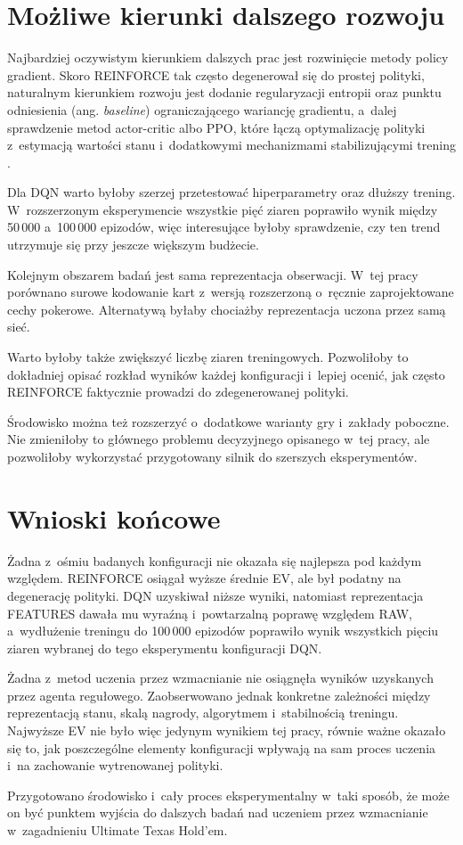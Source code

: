 \section*{Możliwe kierunki dalszego rozwoju}
\label{sec:dalszy-rozwoj}

Najbardziej oczywistym kierunkiem dalszych prac jest rozwinięcie
metody policy gradient. Skoro REINFORCE tak często degenerował się do
prostej polityki, naturalnym kierunkiem rozwoju jest dodanie regularyzacji
entropii oraz punktu odniesienia (ang. \emph{baseline}) ograniczającego wariancję gradientu, a~dalej
sprawdzenie metod actor-critic albo PPO, które
łączą optymalizację
polityki z~estymacją wartości stanu i~dodatkowymi mechanizmami
stabilizującymi trening \cite{schulman_ppo_2017}.

Dla DQN warto byłoby szerzej przetestować hiperparametry oraz dłuższy
trening. W~rozszerzonym eksperymencie wszystkie pięć ziaren poprawiło
wynik między 50\,000 a~100\,000 epizodów, więc interesujące byłoby
sprawdzenie, czy ten trend utrzymuje się przy jeszcze większym
budżecie.

Kolejnym obszarem badań jest sama reprezentacja obserwacji. W~tej pracy
porównano surowe kodowanie kart z~wersją rozszerzoną o~ręcznie
zaprojektowane cechy pokerowe. Alternatywą byłaby chociażby reprezentacja
uczona przez samą sieć.

Warto byłoby także zwiększyć liczbę ziaren treningowych. Pozwoliłoby to
dokładniej opisać rozkład wyników każdej konfiguracji i~lepiej
ocenić, jak często REINFORCE faktycznie prowadzi do zdegenerowanej
polityki.

Środowisko można też rozszerzyć o~dodatkowe warianty gry i~zakłady
poboczne. Nie zmieniłoby to głównego problemu decyzyjnego opisanego w~tej
pracy, ale pozwoliłoby wykorzystać przygotowany silnik do szerszych
eksperymentów.

\section*{Wnioski końcowe}
\label{sec:podsumowanie-koncowe}

Żadna z~ośmiu badanych konfiguracji nie okazała się najlepsza pod
każdym względem. REINFORCE osiągał wyższe średnie EV, ale był podatny
na degenerację polityki. DQN uzyskiwał niższe wyniki, natomiast
reprezentacja FEATURES dawała mu wyraźną i~powtarzalną poprawę
względem RAW, a~wydłużenie treningu do 100\,000 epizodów poprawiło
wynik wszystkich pięciu ziaren wybranej do tego eksperymentu
konfiguracji DQN.

Żadna z~metod uczenia przez wzmacnianie nie osiągnęła wyników
uzyskanych przez agenta regułowego. Zaobserwowano jednak konkretne
zależności między
reprezentacją stanu, skalą nagrody, algorytmem i~stabilnością
treningu. Najwyższe EV nie było więc jedynym wynikiem tej pracy,
równie ważne okazało się to, jak poszczególne elementy konfiguracji
wpływają na sam proces uczenia i~na zachowanie wytrenowanej polityki.

Przygotowano środowisko i~cały proces eksperymentalny w~taki sposób, że może
on być punktem wyjścia do dalszych badań nad uczeniem przez wzmacnianie
w~zagadnieniu Ultimate Texas Hold'em.
